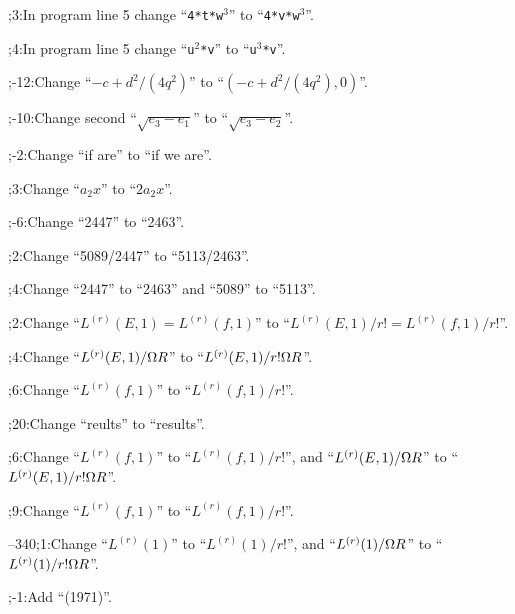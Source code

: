 ;3:In program line 5 change ``{\tt 4*t*w$^3$}'' to ``{\tt 4*v*w$^3$}''.\par
{};4:In program line 5 change ``{\tt u$^2$*v}'' to ``{\tt u$^3$*v}''.\par
{};-12:Change ``$-c+d^2/(4q^2)$'' to ``$(-c+d^2/(4q^2),0)$''.\par
{};-10:Change second ``$\sqrt{e_3-e_1}$'' to
``$\sqrt{e_3-e_2}$''.\par
{};-2:Change ``if are'' to ``if we are''.\par
{};3:Change ``$a_2x$'' to ``$2a_2x$''.\par
{};-6:Change ``2447'' to ``2463''.\par
{};2:Change ``5089/2447'' to ``5113/2463''.\par
%
%
;4:Change ``2447'' to ``2463'' and ``5089'' to ``5113''.\par
{};2:Change ``$L^{(r)}(E,1)=L^{(r)}(f,1)$'' to 
``$L^{(r)}(E,1)/r!=L^{(r)}(f,1)/r!$''.\par
{};4:Change ``$L^{(r)}(E,1)/\Omega R$'' to ``$L^{(r)}(E,1)/r!\Omega R$''.\par
{};6:Change ``$L^{(r)}(f,1)$'' to ``$L^{(r)}(f,1)/r!$''.\par
{};20:Change ``reults'' to ``results''.\par
{};6:Change ``$L^{(r)}(f,1)$'' to ``$L^{(r)}(f,1)/r!$'', 
and \hfill\break ``$L^{(r)}(E,1)/\Omega R$'' to ``$L^{(r)}(E,1)/r!\Omega R$''.\par
{};9:Change ``$L^{(r)}(f,1)$'' to ``$L^{(r)}(f,1)/r!$''.\par
{}--340;1:Change ``$L^{(r)}(1)$'' to ``$L^{(r)}(1)/r!$'', and
\hfill\break ``$L^{(r)}(1)/\Omega R$'' to ``$L^{(r)}(1)/r!\Omega R$''.\par
%
%
;-1:Add ``(1971)''.\par

\bigskip
{}
\rightline{\lastupdate}

\bye
